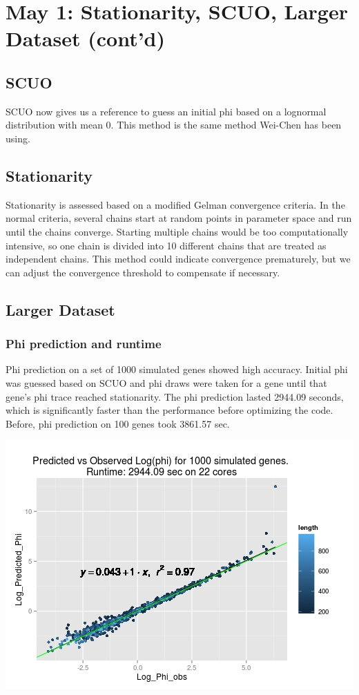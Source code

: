 \documentclass{article}
\begin{document}
 \section{May 1: Stationarity, SCUO, Larger Dataset (cont'd)} 	
 	
 \subsection{SCUO}
 	
 	SCUO now gives us a reference to guess an initial phi based on a lognormal distribution with mean 0. This method is the same method Wei-Chen has been using.
 	
 \subsection{Stationarity}
 
 	Stationarity is assessed based on a modified Gelman convergence criteria. In the normal criteria, several chains start at random points in parameter space and run until the chains converge. Starting multiple chains would be too computationally intensive, so one chain is divided into 10 different chains that are treated as independent chains. This method could indicate convergence prematurely, but we can adjust the convergence threshold to compensate if necessary.
 	
 \subsection{Larger Dataset}

	\subsubsection{Phi prediction and runtime}
	
	Phi prediction on a set of 1000 simulated genes showed high accuracy. Initial phi was guessed based on SCUO and phi draws were taken for a gene until that gene's phi trace reached stationarity.  The phi prediction lasted 2944.09 seconds, which is significantly faster than the performance before optimizing the code. Before, phi prediction on 100 genes took 3861.57 sec.
 
 	\includegraphics[scale=0.5]{../1000_test/scuo_conv/Rplot.jpeg}
 	
\end{document}
